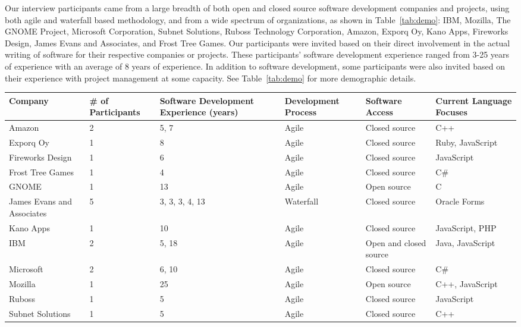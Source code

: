 \documentclass[conference]{IEEEtran}
\begin{document}
Our interview participants came from a large breadth of both open and closed source software development companies
and projects, using both  agile and waterfall based methodology, and from a wide spectrum of organizations, as shown in Table~\ref{tab:demo}: IBM, Mozilla, The GNOME Project, Microsoft Corporation, Subnet Solutions, Ruboss Technology Corporation, 
Amazon, Exporq Oy, Kano Apps, Fireworks Design, James Evans and Associates, and Frost Tree Games. 
Our participants were invited based on their direct involvement in the actual writing of software for
their respective companies or projects. These participants' software development experience ranged from 3-25 years of experience
with an average of 8 years of experience.
In addition to software development, some participants were also invited based on their experience with project management
at some capacity. See Table~\ref{tab:demo} for more demographic details.

\begin{table*}[tb!]
\begin{center}
\begin{tabular}{| l | p{2cm} | p{2cm} | p{2cm} | p{2cm} | p{2cm} |}
\hline
Company & \# of Participants & Software Development Experience (years) & Development Process & Software Access & Current Language Focuses \\
\hline
\hline
Amazon & 2 & 5, 7 & Agile & Closed source & C++ \\ \hline
Exporq Oy & 1 & 8 & Agile & Closed source & Ruby, JavaScript \\ \hline
Fireworks Design & 1 & 6 & Agile & Closed source & JavaScript \\ \hline
Frost Tree Games & 1 & 4 & Agile & Closed source & C\# \\ \hline
GNOME & 1 & 13 & Agile & Open source & C \\ \hline
James Evans and Associates & 5 & 3, 3, 3, 4, 13 & Waterfall & Closed source & Oracle Forms \\ \hline
Kano Apps & 1 & 10 & Agile & Closed source & JavaScript, PHP \\ \hline
IBM & 2 & 5, 18 & Agile & Open and closed source & Java, JavaScript \\ \hline
Microsoft & 2 & 6, 10 & Agile & Closed source & C\# \\ \hline
Mozilla & 1 & 25 & Agile & Open source & C++, JavaScript \\ \hline
Ruboss & 1 & 5 & Agile & Closed source & JavaScript \\ \hline 
Subnet Solutions & 1 & 5 & Agile & Closed source & C++ \\ \hline

\end{tabular}
\end{center}
\caption{Demographic information of interview participants.\label{tab:demo}}
\end{table*}
\end{document}
